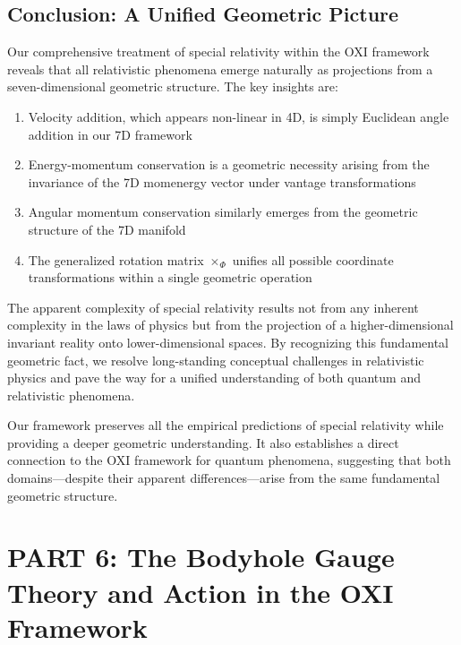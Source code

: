 \documentclass{article}
\begin{document}
\subsection{Conclusion: A Unified Geometric Picture}

Our comprehensive treatment of special relativity within the OXI framework reveals that all relativistic phenomena emerge naturally as projections from a seven-dimensional geometric structure. The key insights are:

\begin{enumerate}
\item Velocity addition, which appears non-linear in 4D, is simply Euclidean angle addition in our 7D framework

\item Energy-momentum conservation is a geometric necessity arising from the invariance of the 7D momenergy vector under vantage transformations

\item Angular momentum conservation similarly emerges from the geometric structure of the 7D manifold

\item The generalized rotation matrix $\times_\Phi$ unifies all possible coordinate transformations within a single geometric operation
\end{enumerate}

The apparent complexity of special relativity results not from any inherent complexity in the laws of physics but from the projection of a higher-dimensional invariant reality onto lower-dimensional spaces. By recognizing this fundamental geometric fact, we resolve long-standing conceptual challenges in relativistic physics and pave the way for a unified understanding of both quantum and relativistic phenomena.

Our framework preserves all the empirical predictions of special relativity while providing a deeper geometric understanding. It also establishes a direct connection to the OXI framework for quantum phenomena, suggesting that both domains—despite their apparent differences—arise from the same fundamental geometric structure.










\section{PART 6: The Bodyhole Gauge Theory and Action in the OXI Framework}
\end{document}
